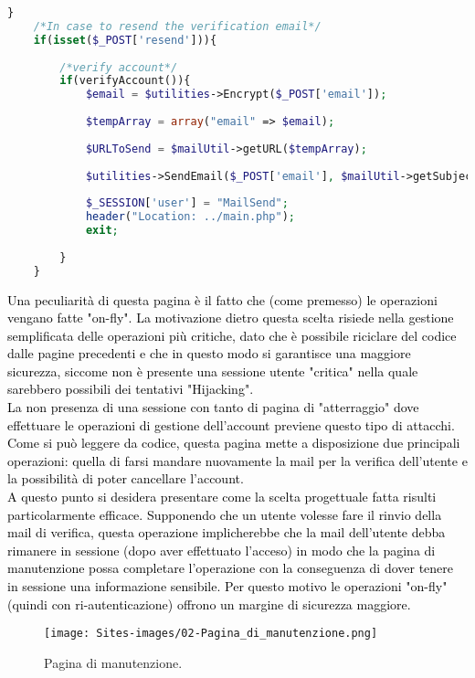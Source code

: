 \begin{lstlisting}[language=php]
	}
	/*In case to resend the verification email*/
	if(isset($_POST['resend'])){
		
		/*verify account*/
		if(verifyAccount()){
			$email = $utilities->Encrypt($_POST['email']);
			
			$tempArray = array("email" => $email);
			
			$URLToSend = $mailUtil->getURL($tempArray);
			
			$utilities->SendEmail($_POST['email'], $mailUtil->getSubject(), $mailUtil->getBody($URLToSend), $mailUtil->getAlternativeBody($URLToSend));
			
			$_SESSION['user'] = "MailSend";
			header("Location: ../main.php");
			exit;
			
		}
	}
\end{lstlisting}

\textcolor{black}{Una peculiarità di questa pagina è il fatto che (come premesso) le operazioni vengano fatte "on-fly". La motivazione dietro questa scelta risiede nella gestione semplificata delle operazioni più critiche, dato che è possibile riciclare del codice dalle pagine precedenti e che in questo modo si garantisce una maggiore sicurezza, siccome non è presente una sessione utente "critica" nella quale sarebbero possibili dei tentativi "Hijacking". \\
La non presenza di una sessione con tanto di pagina di "atterraggio" dove effettuare le operazioni di gestione dell'account previene questo tipo di attacchi.\\
Come si può leggere da codice, questa pagina mette a disposizione due principali operazioni: quella di farsi mandare nuovamente la mail per la verifica dell'utente e la possibilità di poter cancellare l'account.\\
A questo punto si desidera presentare come la scelta progettuale fatta risulti particolarmente efficace. Supponendo che un utente volesse fare il rinvio della mail di verifica, questa operazione implicherebbe che la mail dell'utente debba rimanere in sessione (dopo aver effettuato l'acceso) in modo che la pagina di manutenzione possa completare l'operazione con la conseguenza di dover tenere in sessione una informazione sensibile. Per questo motivo le operazioni "on-fly" (quindi con ri-autenticazione) offrono un margine di sicurezza maggiore.}\\

\begin{figure}[h]
	\begin{center}
		\texttt{[image: Sites-images/02-Pagina\_di\_manutenzione.png]}
		\caption{Pagina di manutenzione.}
	\end{center}
\end{figure}